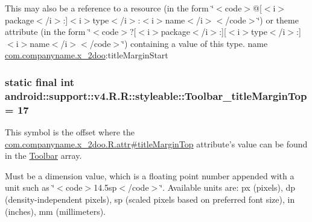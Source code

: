 This may also be a reference to a resource (in the form \char`\"{}$<$code$>$@\mbox{[}$<$i$>$package$<$/i$>$:\mbox{]}$<$i$>$type$<$/i$>$:$<$i$>$name$<$/i$>$$<$/code$>$\char`\"{}) or theme attribute (in the form \char`\"{}$<$code$>$?\mbox{[}$<$i$>$package$<$/i$>$:\mbox{]}\mbox{[}$<$i$>$type$<$/i$>$:\mbox{]}$<$i$>$name$<$/i$>$$<$/code$>$\char`\"{}) containing a value of this type.  name \hyperlink{namespacecom_1_1companyname_1_1x__2doo}{com.companyname.x\_\-2doo}:titleMarginStart \hypertarget{classandroid_1_1support_1_1v4_1_1_r_1_1styleable_1a1bd2c6b7f34b8a59f7763da63777e2}{
\subsubsection[{Toolbar\_\-titleMarginTop}]{\setlength{\rightskip}{0pt plus 5cm}static final int android::support::v4.R.R::styleable::Toolbar\_\-titleMarginTop = 17}}
\label{classandroid_1_1support_1_1v4_1_1_r_1_1styleable_1a1bd2c6b7f34b8a59f7763da63777e2}


This symbol is the offset where the \hyperlink{classcom_1_1companyname_1_1x__2doo_1_1_r_1_1attr_e2fcf93b6f5f16306b3eb381362f7837}{com.companyname.x\_\-2doo.R.attr\#titleMarginTop} attribute's value can be found in the \hyperlink{classandroid_1_1support_1_1v4_1_1_r_1_1styleable_0646d71cfbd4a8645c7d805b33e1c574}{Toolbar} array.

Must be a dimension value, which is a floating point number appended with a unit such as \char`\"{}$<$code$>$14.5sp$<$/code$>$\char`\"{}. Available units are: px (pixels), dp (density-independent pixels), sp (scaled pixels based on preferred font size), in (inches), mm (millimeters). 

